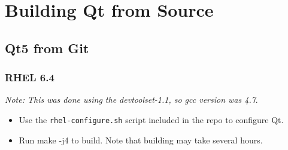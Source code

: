 \documentclass[12pt]{report}
\begin{document}
\section*{Building Qt from Source}

\subsection*{Qt5 from Git}
\subsubsection*{RHEL 6.4}

\emph{Note: This was done using the devtoolset-1.1, so gcc version was 4.7}.

\begin{itemize}
\item Use the \texttt{rhel-configure.sh} script included in the repo to configure Qt. 
\item Run make -j4 to build.  Note that building may take several hours. 
\end{itemize}
\end{document}
